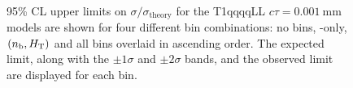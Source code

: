 \begin{figure}[!h]
    \centering
     ~~
    \caption{
        95\% CL upper limits on $\sigma/\sigma_{\mathrm{theory}}$ for the
        T1qqqqLL $c\tau=0.001~\mathrm{mm}$ models are shown for four different
        bin combinations: no bins, \scalht-only, $(n_{\text{b}},\mbox{$H_\text{T}$})$ and all bins
        overlaid in ascending order. The expected limit, along with the
        $\pm 1\sigma$ and $\pm 2\sigma$ bands, and the observed limit are
        displayed for each bin.
    }
    \label{fig:T1qqqqLL_ctau_0p001_limitsPerBin}
\end{figure}

